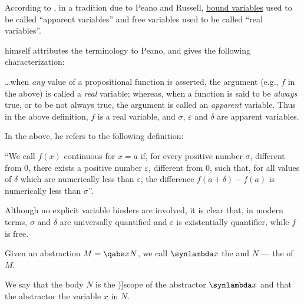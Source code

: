 \begin{remark}\label{rem:apparent_variables}
  According to \cite[11]{Church1956LogicVol1}, in a tradition due to Peano and Russell, \hyperref[con:variable_binding]{bound variables} used to be called \enquote{apparent variables} and free variables used to be called \enquote{real variables}.

  \textcite[228]{Russell1908TypeTheory} himself attributes the terminology to Peano, and gives the following characterization:
  \begin{displayquote}
    \ldots when \textit{any} value of a propositional function is asserted, the argument (e.g., \( f \) in the above) is called a \textit{real} variable; whereas, when a function is said to be \textit{always} true, or to be not always true, the argument is called an \textit{apparent} variable. Thus in the above definition, \( f \) is a real variable, and \( \sigma \), \( \varepsilon \) and \( \delta \) are apparent variables.
  \end{displayquote}

  In the above, he refers to the following definition:
  \begin{displayquote}
    \enquote{We call \( f(x) \) continuous for \( x = a \) if, for every positive number \( \sigma \), different from \( 0 \), there exists a positive number \( \varepsilon \), different from \( 0 \), such that, for all values of \( \delta \) which are numerically less than \( \varepsilon \), the difference \( f(a + \delta) - f(a) \) is numerically less than \( \sigma \)}.
  \end{displayquote}

  Although no explicit variable binders are involved, it is clear that, in modern terms, \( \sigma \) and \( \delta \) are universally quantified and \( \varepsilon \) is existentially quantifier, while \( f \) is free.
\end{remark}

\begin{definition}\label{def:lambda_abstractor}
  Given an abstraction \( M = \qabs x N \), we call \( \synlambda x \) the  and \( N \) --- the  of \( M \).

  We say that the body \( N \) is the \term[ru=область действия (квантора) (\cite[87]{Герасимов2014Вычислимость})]{scope} of the abstractor \( \synlambda x \) and that the abstractor  the variable \( x \) in \( N \).
\end{definition}

